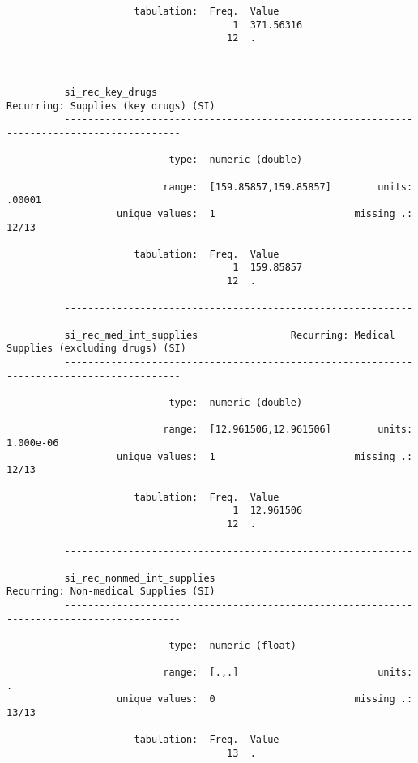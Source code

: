 \documentclass{article}
\begin{document}
\begin{verbatim}
                      tabulation:  Freq.  Value
                                       1  371.56316
                                      12  .
          
          ------------------------------------------------------------------------------------------
          si_rec_key_drugs                                      Recurring: Supplies (key drugs) (SI)
          ------------------------------------------------------------------------------------------
          
                            type:  numeric (double)
          
                           range:  [159.85857,159.85857]        units:  .00001
                   unique values:  1                        missing .:  12/13
          
                      tabulation:  Freq.  Value
                                       1  159.85857
                                      12  .
          
          ------------------------------------------------------------------------------------------
          si_rec_med_int_supplies                Recurring: Medical Supplies (excluding drugs) (SI)
          ------------------------------------------------------------------------------------------
          
                            type:  numeric (double)
          
                           range:  [12.961506,12.961506]        units:  1.000e-06
                   unique values:  1                        missing .:  12/13
          
                      tabulation:  Freq.  Value
                                       1  12.961506
                                      12  .
          
          ------------------------------------------------------------------------------------------
          si_rec_nonmed_int_supplies                            Recurring: Non-medical Supplies (SI)
          ------------------------------------------------------------------------------------------
          
                            type:  numeric (float)
          
                           range:  [.,.]                        units:  .
                   unique values:  0                        missing .:  13/13
          
                      tabulation:  Freq.  Value
                                      13  .
          

\end{verbatim}
\end{document}
